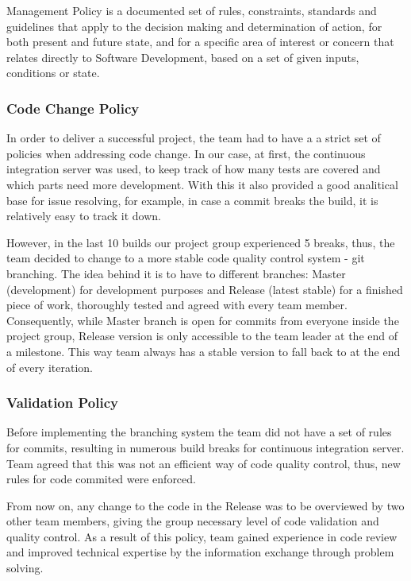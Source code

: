 \documentclass[10pt]{article}
\begin{document}
Management Policy is a documented set of rules, constraints, standards and guidelines that apply to the decision making and determination of action, for both present and future state, and for a specific area of interest or concern that relates directly to Software Development, based on a set of given inputs, conditions or state.

\subsubsection{Code Change Policy}

In order to deliver a successful project, the team had to have a a strict set of policies when addressing code change. In our case, at first, the continuous integration server was used, to keep track of how many tests are covered and which parts need more development. With this it also provided a good analitical base for issue resolving, for example, in case a commit breaks the build, it is relatively easy to track it down.

However, in the last 10 builds our project group experienced 5 breaks, thus, the team decided to change to a more stable code quality control system - git branching. The idea behind it is to have to different branches: Master (development) for development purposes and Release (latest stable) for a finished piece of work, thoroughly tested and agreed with every team member. Consequently, while Master branch is open for commits from everyone inside the project group, Release version is only accessible to the team leader at the end of a milestone. This way team always has a stable version to fall back to at the end of every iteration.

\subsubsection{Validation Policy}

Before implementing the branching system the team did not have a set of rules for commits, resulting in numerous build breaks for continuous integration server. Team agreed that this was not an efficient way of code quality control, thus, new rules for code commited were enforced. 

From now on, any change to the code in the Release was to be overviewed by two other team members, giving the group necessary level of code validation and quality control. As a result of this policy, team gained experience in code review and improved technical expertise by the information exchange through problem solving.
\end{document}
